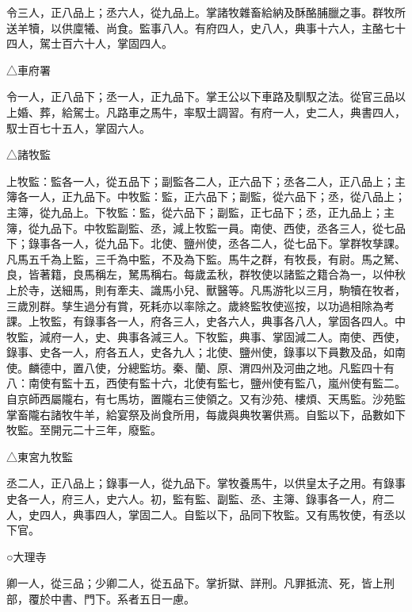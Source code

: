 \begin{pinyinscope}
 令三人，正八品上；丞六人，從九品上。掌諸牧雜畜給納及酥酪脯臘之事。群牧所送羊犢，以供廩犧、尚食。監事八人。有府四人，史八人，典事十六人，主酪七十四人，駕士百六十人，掌固四人。



 △車府署



 令一人，正八品下；丞一人，正九品下。掌王公以下車路及馴馭之法。從官三品以上婚、葬，給駕士。凡路車之馬牛，率馭士調習。有府一人，史二人，典書四人，馭士百七十五人，掌固六人。



 △諸牧監



 上牧監：監各一人，從五品下；副監各二人，正六品下；丞各二人，正八品上；主簿各一人，正九品下。中牧監：監，正六品下；副監，從六品下；丞，從八品上；主簿，從九品上。下牧監：監，從六品下；副監，正七品下；丞，正九品上；主簿，從九品下。中牧監副監、丞，減上牧監一員。南使、西使，丞各三人，從七品下；錄事各一人，從九品下。北使、鹽州使，丞各二人，從七品下。掌群牧孳課。凡馬五千為上監，三千為中監，不及為下監。馬牛之群，有牧長，有尉。馬之駑、良，皆著籍，良馬稱左，駑馬稱右。每歲孟秋，群牧使以諸監之籍合為一，以仲秋上於寺，送細馬，則有牽夫、識馬小兒、獸醫等。凡馬游牝以三月，駒犢在牧者，三歲別群。孳生過分有賞，死耗亦以率除之。歲終監牧使巡按，以功過相除為考課。上牧監，有錄事各一人，府各三人，史各六人，典事各八人，掌固各四人。中牧監，減府一人，史、典事各減三人。下牧監，典事、掌固減二人。南使、西使，錄事、史各一人，府各五人，史各九人；北使、鹽州使，錄事以下員數及品，如南使。麟德中，置八使，分總監坊。秦、蘭、原、渭四州及河曲之地。凡監四十有八：南使有監十五，西使有監十六，北使有監七，鹽州使有監八，嵐州使有監二。自京師西屬隴右，有七馬坊，置隴右三使領之。又有沙苑、樓煩、天馬監。沙苑監掌畜隴右諸牧牛羊，給宴祭及尚食所用，每歲與典牧署供焉。自監以下，品數如下牧監。至開元二十三年，廢監。



 △東宮九牧監



 丞二人，正八品上；錄事一人，從九品下。掌牧養馬牛，以供皇太子之用。有錄事史各一人，府三人，史六人。初，監有監、副監、丞、主簿、錄事各一人，府二人，史四人，典事四人，掌固二人。自監以下，品同下牧監。又有馬牧使，有丞以下官。



 ○大理寺



 卿一人，從三品；少卿二人，從五品下。掌折獄、詳刑。凡罪抵流、死，皆上刑部，覆於中書、門下。系者五日一慮。




\end{pinyinscope}
